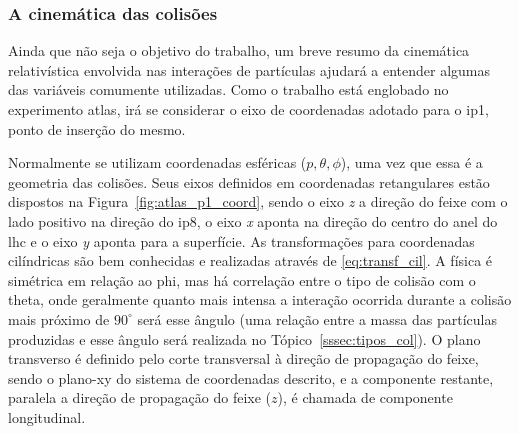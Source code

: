 \subsubsection{A cinemática das colisões}
\label{sssec:cinematica}

Ainda que não seja o objetivo do trabalho, um breve resumo da cinemática
relativística envolvida nas interações de partículas ajudará a entender algumas
das variáveis comumente utilizadas. 
Como o trabalho está englobado no experimento \gls{atlas}, irá se considerar o 
eixo de coordenadas adotado para o \gls{ip}1, ponto de inserção do mesmo. 


Normalmente se utilizam coordenadas esféricas ($p,\theta,\phi$), uma vez que 
essa é a geometria das colisões.
Seus eixos definidos em coordenadas retangulares estão dispostos 
na Figura~\ref{fig:atlas_p1_coord}, sendo o eixo \emph{z} a direção do feixe com
o lado positivo na direção do \gls{ip}8, o eixo
\emph{x} aponta na direção do centro do anel do \gls{lhc} e o eixo \emph{y}
aponta para a superfície.  
As transformações para coordenadas cilíndricas
são bem conhecidas e realizadas através de \ref{eq:transf_cil}.  
A física é simétrica em relação ao \gls{phi}, 
mas há correlação entre o
tipo de colisão com o \gls{theta}, onde geralmente quanto mais intensa a
interação ocorrida durante a colisão mais próximo de $90^\circ$ será esse
ângulo (uma relação entre a massa das partículas produzidas e esse ângulo
será realizada no Tópico~\ref{sssec:tipos_col}). O plano transverso é definido 
pelo corte transversal à direção de propagação do feixe, sendo o plano-xy do
sistema de coordenadas descrito, e a componente restante, paralela a direção de
propagação do feixe ($z$), é chamada de componente longitudinal.

